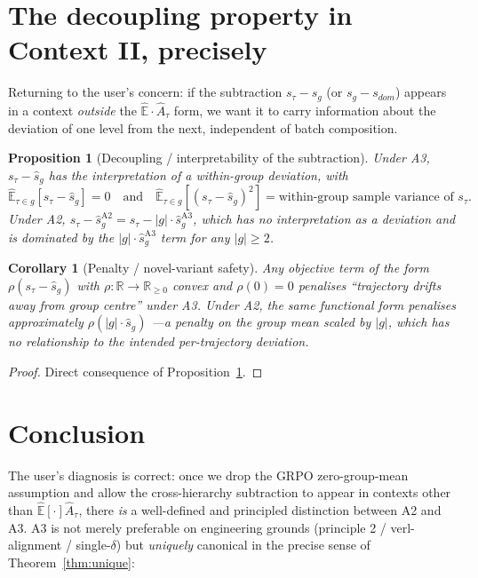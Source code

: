 \documentclass[11pt]{article}
\newcommand{\Ehat}{\widehat{\mathbb{E}}}
\newtheorem{proposition}{Proposition}
\newtheorem{corollary}{Corollary}
\begin{document}
\section{The decoupling property in Context II, precisely}

Returning to the user's concern: if the subtraction $s_\tau-s_g$ (or
$s_g-s_{dom}$) appears in a context \emph{outside} the $\Ehat\cdot\hat
A_\tau$ form, we want it to carry information about the deviation of one
level from the next, independent of batch composition.

\begin{proposition}[Decoupling / interpretability of the subtraction]
\label{prop:decouple}
Under A3, $s_\tau - \widehat s_g$ has the interpretation of a
within-group deviation, with
\[
\Ehat_{\tau\in g}[s_\tau - \widehat s_g] = 0
\quad\text{and}\quad
\Ehat_{\tau\in g}[(s_\tau - \widehat s_g)^2] = \text{within-group sample variance of }s_\tau.
\]
Under A2, $s_\tau - \widehat s_g^{\text{A2}} = s_\tau - |g|\cdot\widehat s_g^{\text{A3}}$,
which has no interpretation as a deviation and is dominated by the
$|g|\cdot\widehat s_g^{\text{A3}}$ term for any $|g|\geq 2$.
\end{proposition}

\begin{corollary}[Penalty / novel-variant safety]
Any objective term of the form $\rho(s_\tau - \widehat s_g)$ with
$\rho:\mathbb R\to\mathbb R_{\geq 0}$ convex and $\rho(0)=0$ penalises
``trajectory drifts away from group centre'' under A3. Under A2, the
same functional form penalises approximately $\rho(|g|\cdot\widehat s_g)$
---a penalty on the group mean scaled by $|g|$, which has no relationship
to the intended per-trajectory deviation.
\end{corollary}

\begin{proof}
Direct consequence of Proposition~\ref{prop:decouple}.
\end{proof}

\section{Conclusion}

The user's diagnosis is correct: once we drop the GRPO zero-group-mean
assumption and allow the cross-hierarchy subtraction to appear in
contexts other than $\Ehat[\cdot]\hat A_\tau$, there \emph{is} a
well-defined and principled distinction between A2 and A3. A3 is not
merely preferable on engineering grounds (principle 2 / verl-alignment /
single-$\delta$) but \emph{uniquely} canonical in the precise sense of
Theorem~\ref{thm:unique}:
\end{document}
